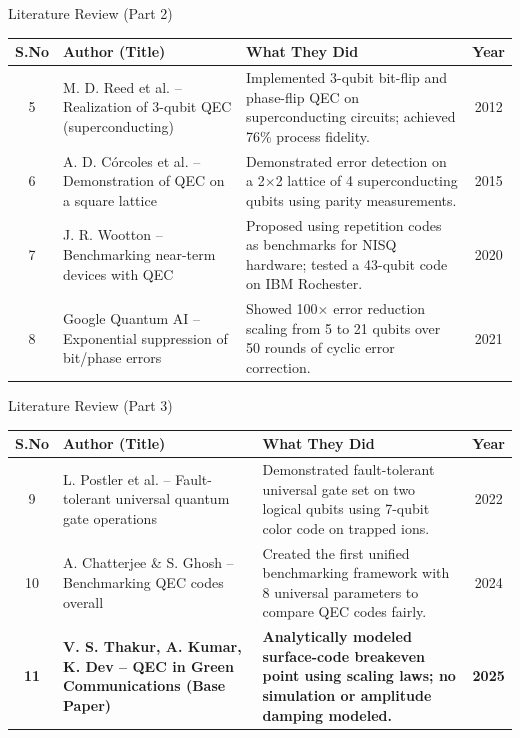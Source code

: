 \documentclass[aspectratio=169]{beamer}
\begin{document}
\begin{frame}{Literature Review (Part 2)}
\scriptsize
\begin{table}
\centering
\begin{tabular}{c p{3.8cm} p{6.5cm} c}
\toprule
\textbf{S.No} & \textbf{Author (Title)} & \textbf{What They Did} & \textbf{Year} \\
\midrule
5 & M. D. Reed et al. -- Realization of 3-qubit QEC (superconducting) & Implemented 3-qubit bit-flip and phase-flip QEC on superconducting circuits; achieved 76\% process fidelity. & 2012 \\[4pt]
6 & A. D. C\'orcoles et al. -- Demonstration of QEC on a square lattice & Demonstrated error detection on a 2$\times$2 lattice of 4 superconducting qubits using parity measurements. & 2015 \\[4pt]
7 & J. R. Wootton -- Benchmarking near-term devices with QEC & Proposed using repetition codes as benchmarks for NISQ hardware; tested a 43-qubit code on IBM Rochester. & 2020 \\[4pt]
8 & Google Quantum AI -- Exponential suppression of bit/phase errors & Showed 100$\times$ error reduction scaling from 5 to 21 qubits over 50 rounds of cyclic error correction. & 2021 \\
\bottomrule
\end{tabular}
\end{table}
\end{frame}
\begin{frame}{Literature Review (Part 3)}
\scriptsize
\begin{table}
\centering
\begin{tabular}{c p{3.8cm} p{6.5cm} c}
\toprule
\textbf{S.No} & \textbf{Author (Title)} & \textbf{What They Did} & \textbf{Year} \\
\midrule
9 & L. Postler et al. -- Fault-tolerant universal quantum gate operations & Demonstrated fault-tolerant universal gate set on two logical qubits using 7-qubit color code on trapped ions. & 2022 \\[4pt]
10 & A. Chatterjee \& S. Ghosh -- Benchmarking QEC codes overall & Created the first unified benchmarking framework with 8 universal parameters to compare QEC codes fairly. & 2024 \\[4pt]
\midrule
\textbf{11} & \textbf{V. S. Thakur, A. Kumar, K. Dev -- QEC in Green Communications (Base Paper)} & \textbf{Analytically modeled surface-code breakeven point using scaling laws; no simulation or amplitude damping modeled.} & \textbf{2025} \\
\bottomrule
\end{tabular}
\end{table}
\end{frame}
\end{document}
